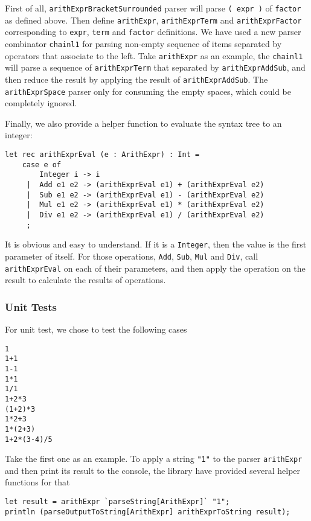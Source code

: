 First of all, \texttt{arithExprBracketSurrounded} parser will parse \texttt{( expr )} of \texttt{factor} as defined above. Then define \texttt{arithExpr}, \texttt{arithExprTerm} and \texttt{arithExprFactor} corresponding to \texttt{expr}, \texttt{term} and \texttt{factor} definitions. We have used a new parser combinator \texttt{chainl1} for parsing non-empty sequence of items separated by operators that associate to the left. Take \texttt{arithExpr} as an example, the \texttt{chainl1} will parse a sequence of \texttt{arithExprTerm} that separated by \texttt{arithExprAddSub}, and then reduce the result by applying the result of \texttt{arithExprAddSub}. The \texttt{arithExprSpace} parser only for consuming the empty spaces, which could be completely ignored.

Finally, we also provide a helper function to evaluate the syntax tree to an integer:

\begin{lstlisting}
let rec arithExprEval (e : ArithExpr) : Int =
    case e of
        Integer i -> i
     |  Add e1 e2 -> (arithExprEval e1) + (arithExprEval e2)
     |  Sub e1 e2 -> (arithExprEval e1) - (arithExprEval e2)
     |  Mul e1 e2 -> (arithExprEval e1) * (arithExprEval e2)
     |  Div e1 e2 -> (arithExprEval e1) / (arithExprEval e2)
     ;
\end{lstlisting}

It is obvious and easy to understand. If it is a \texttt{Integer}, then the value is the first parameter of itself. For those operations, \texttt{Add}, \texttt{Sub}, \texttt{Mul} and \texttt{Div}, call \texttt{arithExprEval} on each of their parameters, and then apply the operation on the result to calculate the results of operations.

\subsubsection{Unit Tests}

For unit test, we chose to test the following cases

\begin{lstlisting}[language={}]
1
1+1
1-1
1*1
1/1
1+2*3
(1+2)*3
1*2+3
1*(2+3)
1+2*(3-4)/5
\end{lstlisting}

Take the first one as an example. To apply a string \texttt{"1"} to the parser \texttt{arithExpr} and then print its result to the console, the library have provided several helper functions for that

\begin{lstlisting}
let result = arithExpr `parseString[ArithExpr]` "1";
println (parseOutputToString[ArithExpr] arithExprToString result);
\end{lstlisting}

